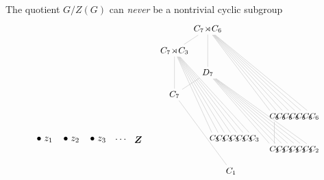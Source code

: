 \documentclass[8pt, handout]{beamer}
\begin{document}
\begin{frame}{The quotient $G/Z(G)$ can \emph{never} be a nontrivial cyclic subgroup}
\[\begin{tikzpicture}[scale=.7]
\begin{scope}[shift={(0,0)},scale=1.5,xscale=1.1]
      \node[anchor=west] at (.85,.27) {$\bullet\;z_1$};
      \node[anchor=west] at (1.7,.27) {$\bullet\;z_2$};
      \node[anchor=west] at (2.55,.27) {$\bullet\;z_3$};
      \node[anchor=west] at (3.35,.27) {$\cdots$};
      \node[anchor=east] at (4.43,.27) {\normalsize $\bm{Z}$};
    \end{scope}
    \begin{scope}[shift={(11.8,-1.25)},scale=1,shorten >= -1pt, shorten <= -1pt,xscale=.7,yscale=1.15]
      \tikzstyle{every node}=[font=\footnotesize]
      \node(G) at (-1.75,\Hh) {\small $C_7\!\rtimes\!C_6$};
      \node(C7-C3) at (-4.25,\Hg) {\small $C_7\!\rtimes\!C_3$};
      \node(D7) at (-1.75,\Hf) {\small $D_7$};
      \node(C7) at (-4.25,\He) {\small $C_7$};
      \node(C3-1) at (-1.25,\Hc) {$C_3$};
      \node(C3-2) at (-.75,\Hc) {$C_3$};
      \node(C3-3) at (-.25,\Hc) {$C_3$};
      \node(C3-4) at (.25,\Hc) {$C_3$};
      \node(C3-5) at (.75,\Hc) {$C_3$};
      \node(C3-6) at (1.25,\Hc) {$C_3$};
      \node(C3-7) at (1.75,\Hc) {$C_3$};
      \node(C6-1) at (3.25,\Hd) {$C_6$};
      \node(C6-2) at (3.75,\Hd) {$C_6$};
      \node(C6-3) at (4.25,\Hd) {$C_6$};
      \node(C6-4) at (4.75,\Hd) {$C_6$};
      \node(C6-5) at (5.25,\Hd) {$C_6$};
      \node(C6-6) at (5.75,\Hd) {$C_6$};
      \node(C6-7) at (6.25,\Hd) {$C_6$};
      \node(C2-1) at (3.25,\Hb) {$C_2$};
      \node(C2-2) at (3.75,\Hb) {$C_2$};
      \node(C2-3) at (4.25,\Hb) {$C_2$};
      \node(C2-4) at (4.75,\Hb) {$C_2$};
      \node(C2-5) at (5.25,\Hb) {$C_2$};
      \node(C2-6) at (5.75,\Hb) {$C_2$};
      \node(C2-7) at (6.25,\Hb) {$C_2$};
      \node(1) at (0,\Ha) {\small $C_1$};
      \draw[faded] (G) to (C7-C3);
      \draw[faded] (G) to (D7);
      \draw[faded] (G) to (C6-1);
      \draw[faded] (G) to (C6-2);
      \draw[faded] (G) to (C6-3);
      \draw[faded] (G) to (C6-4);
      \draw[faded] (G) to (C6-5);
      \draw[faded] (G) to (C6-6);
      \draw[faded] (G) to (C6-7);
      \draw[faded] (D7) to (C7);
      \draw[faded] (D7) to (C2-1);
      \draw[faded] (D7) to (C2-2);
      \draw[faded] (D7) to (C2-3);
      \draw[faded] (D7) to (C2-4);
      \draw[faded] (D7) to (C2-5);
      \draw[faded] (D7) to (C2-6);
      \draw[faded] (D7) to (C2-7);
      \draw[faded] (C7-C3) to (C7);
      \draw[faded] (C7) to (1);
      \draw[faded] (C7-C3) to (C3-1);
      \draw[faded] (C7-C3) to (C3-2);
      \draw[faded] (C7-C3) to (C3-3);
      \draw[faded] (C7-C3) to (C3-4);
      \draw[faded] (C7-C3) to (C3-5);
      \draw[faded] (C7-C3) to (C3-6);
      \draw[faded] (C7-C3) to (C3-7);
      \draw[faded] (C6-1) to (C2-1);

\end{scope}
\end{tikzpicture}\]
\end{frame}
\end{document}
